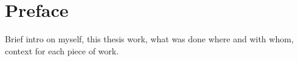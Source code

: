 \chapter{Preface}

Brief intro on myself, this thesis work, what was done where and with whom, context for each piece of work.
